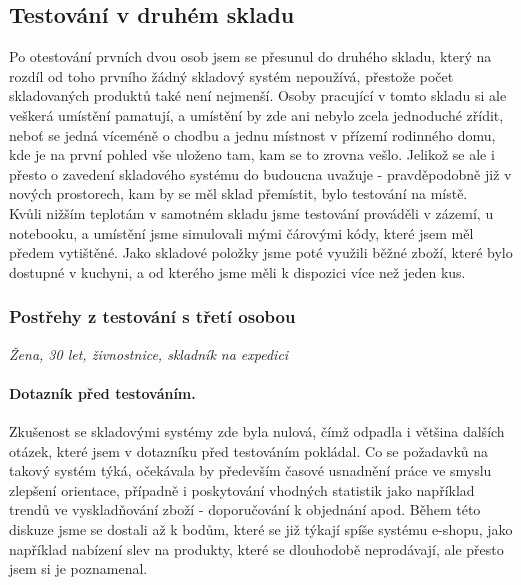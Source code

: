 
\subsection{Testování v druhém skladu}

Po otestování prvních dvou osob jsem se přesunul do druhého skladu, který na rozdíl od toho prvního žádný skladový systém nepoužívá, přestože počet skladovaných produktů také není nejmenší. Osoby pracující v tomto skladu si ale veškerá umístění pamatují, a umístění by zde ani nebylo zcela jednoduché zřídit, neboť se jedná víceméně o chodbu a jednu místnost v přízemí rodinného domu, kde je na první pohled vše uloženo tam, kam se to zrovna vešlo. Jelikož se ale i přesto o zavedení skladového systému do budoucna uvažuje - pravděpodobně již v nových prostorech, kam by se měl sklad přemístit, bylo testování na místě.\\
Kvůli nižším teplotám v samotném skladu jsme testování prováděli v zázemí, u notebooku, a umístění jsme simulovali mými čárovými kódy, které jsem měl předem vytištěné. Jako skladové položky jsme poté využili běžné zboží, které bylo dostupné v kuchyni, a od kterého jsme měli k dispozici více než jeden kus.


\subsubsection{Postřehy z testování s třetí osobou}
\emph{Žena, 30 let, živnostnice, skladník na expedici}

\paragraph{Dotazník před testováním.} Zkušenost se skladovými systémy zde byla nulová, čímž odpadla i většina dalších otázek, které jsem v dotazníku před testováním pokládal. Co se požadavků na takový systém týká, očekávala by především časové usnadnění práce ve smyslu zlepšení orientace, případně i poskytování vhodných statistik jako například trendů ve vyskladňování zboží - doporučování k objednání apod. Během této diskuze jsme se dostali až k bodům, které se již týkají spíše systému e-shopu, jako například nabízení slev na produkty, které se dlouhodobě neprodávají, ale přesto jsem si je poznamenal.

